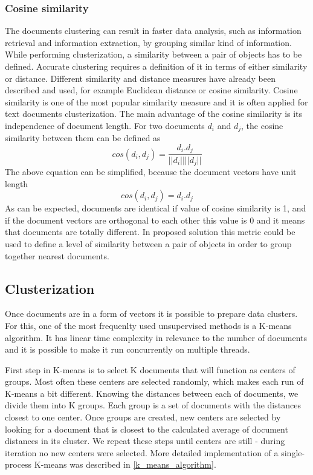 \subsubsection{Cosine similarity}
 The documents clustering can result in faster data analysis, such  as  information retrieval  and  information  extraction,  by  grouping  similar kind  of  information. While performing clusterization, a similarity between a pair of objects has to be defined. Accurate clustering requires a definition of it in terms of either similarity or distance. Different similarity and distance measures have already been described and used, for example Euclidean  distance or cosine  similarity. Cosine  similarity  is  one  of  the  most  popular  similarity  measure and it is often  applied for  text  documents clusterization. The main advantage of the cosine similarity is its independence of document length. For two documents \(d_i\) and \(d_j\), the cosine similarity between them can be defined as
\[cos(d_i, d_j)=\frac{d_i . d_j}{|| d_i || ||d_j ||}\]
The above equation can be simplified, because the document vectors have unit length
\[cos(d_i, d_j)={d_i . d_j}\]
As can be expected, documents are identical if value of cosine similarity is 1, and if the 
document vectors are orthogonal to each other this value is 0 and it means that documents are totally different.
In proposed solution this metric could be used to define a level of similarity between a pair of objects in order to group together nearest documents.
\subsection{Clusterization}
Once documents are in a form of vectors it is possible to prepare data clusters. For this, one of the most frequenlty used unsupervised methods is a K-means algorithm. It has linear time complexity in relevance to the number of documents and it is possible to make it run concurrently on multiple threads. 

First step in K-means is to select K documents that will function as centers of groups. Most often these centers are selected randomly, which makes each run of K-means a bit different.
Knowing the distances between each of documents, we divide them into K groups. Each group is a set of documents with the distances closest to one center. Once groups are created, new centers are selected by looking for a document that is closest to the calculated average of document distances in its cluster. We repeat these steps until centers are still - during iteration no new centers were selected. 
More detailed implementation of a single-process K-means was described in \ref{k_means_algorithm}.

